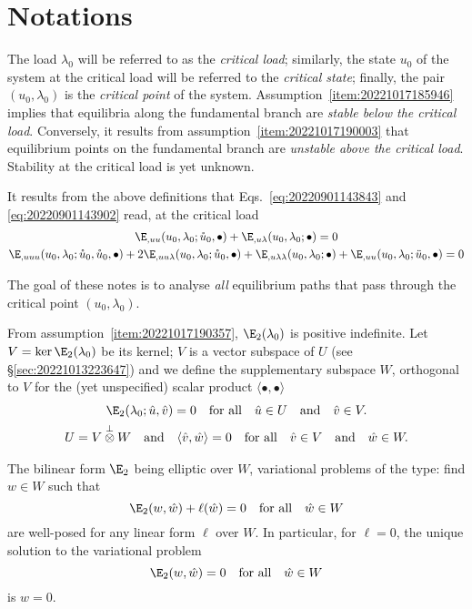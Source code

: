 
\section{Notations}


The load $\lambda_0$ will be referred to as the \emph{critical load}; similarly, the state $u_0$ of the system at the
critical load will be referred to the \emph{critical state}; finally, the pair $(u_0, \lambda_0)$ is the \emph{critical
  point} of the system. Assumption~\ref{item:20221017185946} implies that equilibria along the fundamental branch are
\emph{stable below the critical load}. Conversely, it results from assumption~\ref{item:20221017190003} that equilibrium
points on the fundamental branch are \emph{unstable above the critical load}. Stability at the critical load is yet
unknown.

It results from the above definitions that Eqs.~\eqref{eq:20220901143843} and \eqref{eq:20220901143902} read, at the
critical load
\begin{gather}
  \label{eq:20220901144331}
  \E_{,uu}(u_0, \lambda_0; \mathring{u}_0, \bullet) + \E_{,u\lambda}(u_0, \lambda_0; \bullet) = 0\\
  \label{eq:20220901144335}
  \E_{,uuu}(u_0, \lambda_0; \mathring{u}_0, \mathring{u}_0, \bullet) + 2\E_{,uu\lambda}(u_0, \lambda_0; \mathring{u}_0, \bullet) + \E_{,u\lambda\lambda}(u_0, \lambda_0; \bullet) + \E_{,uu}(u_0, \lambda_0; \ddot{u}_0, \bullet) = 0
\end{gather}

The goal of these notes is to analyse \emph{all} equilibrium paths that pass through the critical point
$(u_0, \lambda_0)$.

From assumption~\ref{item:20221017190357}, $\E_2(\lambda_0)$ is positive indefinite. Let $V = \ker \E_2(\lambda_0)$ be
its kernel; $V$ is a vector subspace of $U$ (see \S \ref{sec:20221013223647}) and we define the supplementary subspace
$W$, orthogonal to $V$ for the (yet unspecified) scalar product $\langle \bullet, \bullet \rangle$
\begin{gather}
  \E_2(\lambda_0; \hat{u}, \hat{v}) = 0 \quad \text{for all} \quad \hat{u} \in U \quad \text{and} \quad \hat{v} \in V.\\
  U = V \overset{\perp}{\otimes} W \quad \text{and} \quad \langle \hat{v}, \hat{w} \rangle = 0 \quad \text{for all} \quad \hat{v} \in V \quad \text{and} \quad \hat{w} \in W.
\end{gather}

\begin{remark}
  \label{rem:20220902095055}
  The bilinear form $\E_2$ being elliptic over $W$, variational problems of the type: find $w \in W$ such that
  \begin{equation}
    \E_2(w, \hat{w})+\ell(\hat{w}) = 0 \quad \text{for all} \quad \hat{w} \in W
  \end{equation}
  are well-posed for any linear form $\ell$ over $W$. In particular, for $\ell=0$, the unique solution to the
  variational problem
  \begin{equation}
    \E_2(w, \hat{w}) = 0 \quad \text{for all} \quad \hat{w} \in W
  \end{equation}
  is $w = 0$.
\end{remark}

